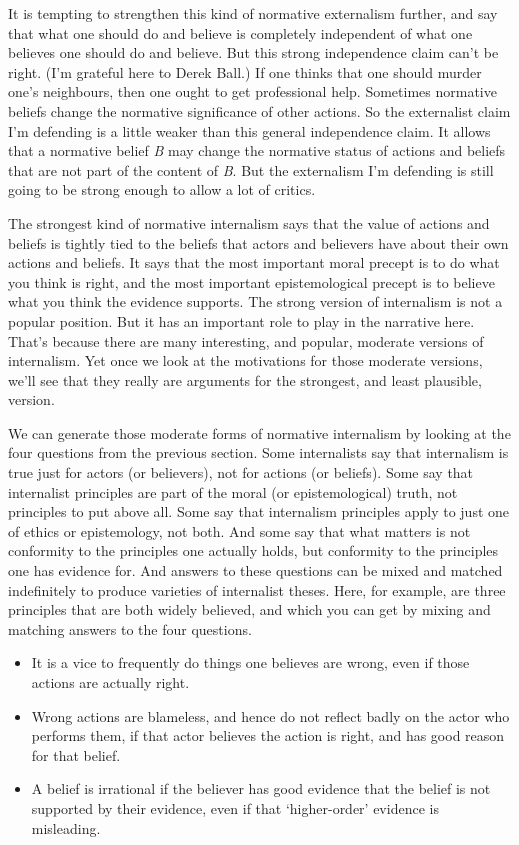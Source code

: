 \documentclass[
  10pt,
  letterpaper,
  twoside]{scrbook}
\providecommand{\tightlist}{%
  \setlength{\itemsep}{0pt}\setlength{\parskip}{0pt}}\usepackage{longtable,booktabs,array}
\begin{document}
It is tempting to strengthen this kind of normative externalism further,
and say that what one should do and believe is completely independent of
what one believes one should do and believe. But this strong
independence claim can't be right. (I'm grateful here to Derek Ball.) If
one thinks that one should murder one's neighbours, then one ought to
get professional help. Sometimes normative beliefs change the normative
significance of other actions. So the externalist claim I'm defending is
a little weaker than this general independence claim. It allows that a
normative belief \emph{B} may change the normative status of actions and
beliefs that are not part of the content of \emph{B}. But the
externalism I'm defending is still going to be strong enough to allow a
lot of critics.

The strongest kind of normative internalism says that the value of
actions and beliefs is tightly tied to the beliefs that actors and
believers have about their own actions and beliefs. It says that the
most important moral precept is to do what you think is right, and the
most important epistemological precept is to believe what you think the
evidence supports. The strong version of internalism is not a popular
position. But it has an important role to play in the narrative here.
That's because there are many interesting, and popular, moderate
versions of internalism. Yet once we look at the motivations for those
moderate versions, we'll see that they really are arguments for the
strongest, and least plausible, version.

We can generate those moderate forms of normative internalism by looking
at the four questions from the previous section. Some internalists say
that internalism is true just for actors (or believers), not for actions
(or beliefs). Some say that internalist principles are part of the moral
(or epistemological) truth, not principles to put above all. Some say
that internalism principles apply to just one of ethics or epistemology,
not both. And some say that what matters is not conformity to the
principles one actually holds, but conformity to the principles one has
evidence for. And answers to these questions can be mixed and matched
indefinitely to produce varieties of internalist theses. Here, for
example, are three principles that are both widely believed, and which
you can get by mixing and matching answers to the four questions.

\begin{itemize}
\tightlist
\item
  It is a vice to frequently do things one believes are wrong, even if
  those actions are actually right.
\item
  Wrong actions are blameless, and hence do not reflect badly on the
  actor who performs them, if that actor believes the action is right,
  and has good reason for that belief.
\item
  A belief is irrational if the believer has good evidence that the
  belief is not supported by their evidence, even if that `higher-order'
  evidence is misleading.
\end{itemize}
\end{document}
